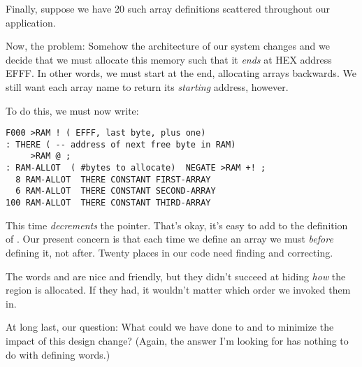Finally, suppose we have 20 such array definitions scattered
throughout our application.

Now, the problem: Somehow the architecture of our system changes and
we decide that we must allocate this memory such that it \emph{ends}
at HEX address EFFF. In other words, we must start at the end,
allocating arrays backwards. We still want each array name to return
its \emph{starting} address, however.

To do this, we must now write:

\begin{verbatim}
F000 >RAM ! ( EFFF, last byte, plus one)
: THERE ( -- address of next free byte in RAM)
     >RAM @ ;
: RAM-ALLOT  ( #bytes to allocate)  NEGATE >RAM +! ;
  8 RAM-ALLOT  THERE CONSTANT FIRST-ARRAY
  6 RAM-ALLOT  THERE CONSTANT SECOND-ARRAY
100 RAM-ALLOT  THERE CONSTANT THIRD-ARRAY
\end{verbatim}

This time  \emph{decrements} the pointer. That's
okay, it's easy to add  to the definition of
. Our present concern is that each time we define an
array we must  \emph{before} defining it, not after. Twenty
places in our code need finding and correcting.

The words  and  are nice and friendly,
but they didn't succeed at hiding \emph{how} the region is
allocated. If they had, it wouldn't matter which order we invoked them
in.

At long last, our question: What could we have done to  and
 to minimize the impact of this design change? (Again, the
answer I'm looking for has nothing to do with defining words.)


